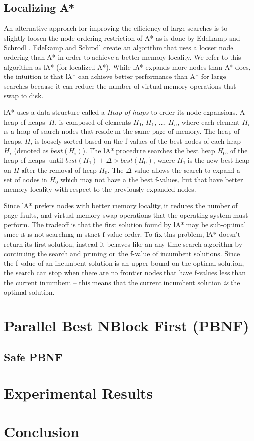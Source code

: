 \documentclass{article}
\begin{document}
\subsection{Localizing A*}

An alternative approach for improving the efficiency of large searches
is to slightly loosen the node ordering restriction of A* as is done
by Edelkamp and Schrodl \cite{edelkamp:loc}.  Edelkamp and Schrodl
create an algorithm that uses a looser node ordering than A* in order
to achieve a better memory locality. We refer to this algorithm as lA*
(for localized A*).  While lA* expands more nodes than A* does, the
intuition is that lA* can achieve better performance than A* for large
searches because it can reduce the number of virtual-memory operations
that swap to disk.

lA* uses a data structure called a \emph{Heap-of-heaps} to order its
node expansions.  A heap-of-heaps, $H$, is composed of elements $H_0$,
$H_1$, ..., $H_n$, where each element $H_i$ is a heap of search nodes
that reside in the same page of memory.  The heap-of-heaps, $H$, is
loosely sorted based on the f-values of the best nodes of each heap
$H_i$ (denoted as $best(H_i)$).  The lA* procedure searches the best
heap $H_0$, of the heap-of-heaps, until $best(H_1) + \Delta >
best(H_0)$, where $H_1$ is the new best heap on $H$ after the removal
of heap $H_0$.  The $\Delta$ value allows the search to expand a set
of nodes in $H_0$ which may not have a the best f-values, but that
have better memory locality with respect to the previously expanded
nodes.

Since lA* prefers nodes with better memory locality, it reduces the
number of page-faults, and virtual memory swap operations that the
operating system must perform.  The tradeoff is that the first
solution found by lA* may be sub-optimal since it is not searching in
strict f-value order.  To fix this problem, lA* doesn't return its
first solution, instead it behaves like an any-time search algorithm
by continuing the search and pruning on the f-value of incumbent
solutions.  Since the f-value of an incumbent solution is an
upper-bound on the optimal solution, the search can stop when there
are no frontier nodes that have f-values less than the current
incumbent -- this means that the current incumbent solution \emph{is}
the optimal solution.

\section{Parallel Best NBlock First (PBNF)}
\subsection{Safe PBNF}
\section{Experimental Results}
\section{Conclusion}



\end{document}
